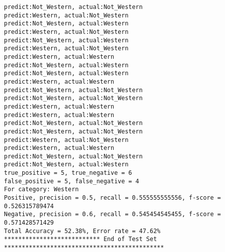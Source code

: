 \documentclass{article}
\begin{document}
\begin{lstlisting}
predict:Not_Western, actual:Not_Western
predict:Western, actual:Not_Western
predict:Not_Western, actual:Western
predict:Western, actual:Not_Western
predict:Not_Western, actual:Western
predict:Western, actual:Not_Western
predict:Western, actual:Western
predict:Not_Western, actual:Western
predict:Not_Western, actual:Western
predict:Western, actual:Western
predict:Not_Western, actual:Not_Western
predict:Not_Western, actual:Not_Western
predict:Western, actual:Western
predict:Western, actual:Western
predict:Not_Western, actual:Not_Western
predict:Not_Western, actual:Not_Western
predict:Western, actual:Not_Western
predict:Western, actual:Western
predict:Not_Western, actual:Not_Western
predict:Not_Western, actual:Western
true_positive = 5, true_negative = 6
false_positive = 5, false_negative = 4
For category: Western
Positive, precision = 0.5, recall = 0.555555555556, f-score = 0.526315789474 
Negative, precision = 0.6, recall = 0.545454545455, f-score = 0.571428571429 
Total Accuracy = 52.38%, Error rate = 47.62%
*************************** End of Test Set *********************************************

\end{lstlisting}
\end{document}

